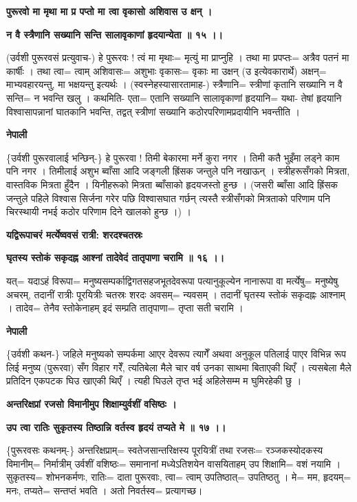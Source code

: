 \documentclass[11pt, a5paper]{article}
\begin{document}
\textbf{पुरूरवो मा मृथा मा प्र पप्तो मा त्वा वृकासो अशिवास उ क्षन् ।}

\textbf{न वै स्त्रैणानि सख्यानि सन्ति सालावृकाणां हृदयान्येता ॥ १५ ।।}

(उर्वशी पुरूरवसं प्रत्युवाच-) हे पुरूरवः ! त्वं मा मृथाः= मृत्युं मा प्राप्नुहि । तथा मा प्रपप्तः= अत्रैव पतनं मा कार्षीः । तथा त्वा= त्वाम् अशिवासः= अशुभाः वृकासः= वृकाः मा उक्षन् (उ इत्येवकारार्थे) अक्षन्= माभ्यवहारयन्तु, मा भक्षयन्तु इत्यर्थः । (स्वस्नेहस्यासारतामाह-) स्त्रैणानि= स्त्रीणां कृतानि सख्यानि न वै सन्ति= न भवन्ति खलु । कथमिति- एता= एतानि सख्यानि सालावृकाणां हृदयानि= यथा- तेषां हृदयानि विश्वासापन्नानां घातकानि भवन्ति, तद्वत् स्त्रीणां सख्यानि कठोरपरिणामप्रदायीनि भवन्तीति ।

\textbf{नेपाली}

\{उर्वशी पुरूरवालाई भन्छिन्-\} हे पुरूरवा ! तिमी बेकारमा मर्ने कुरा नगर । तिमी कतै भुइँमा लड्ने काम पनि नगर । तिमीलाई अशुभ ब्वाँसा आदि जङ्गली ह्रिंसक जन्तुले पनि नखाऊन् । स्त्रीहरूसँगको मित्रता, वास्तविक मित्रता हुँदैन । यिनीहरूको मित्रता ब्बाँसाको हृदयजस्तो हुन्छ । (जसरी ब्बाँसा आदि ह्रिंसक जन्तुले पहिले विश्वास सिर्जना गरेर पछि विश्वासघात गर्छन् त्यस्तै स्त्रीसँगको मित्रताको परिणाम पनि चिरस्थायी नभई कठोर परिणाम दिने खालको हुन्छ ।) ।

\textbf{यद्विरूपाचरं मर्त्येष्ववसं रात्री: शरदश्चतस्रः}

\textbf{घृतस्य स्तोकं सकृदह्न आश्नां तादेवेदं तातृपाणा चरामि ॥ १६ ।।}

यत्= यदाऽहं विरूपा= मनुष्यसम्पर्काद्विगतसहजभूतदेवरूपा पत्यानुकूल्येन नानारूपा वा मर्त्येषु= मनुष्येषु अचरम्,  तदानीं रात्रीः पूरयित्रीः चतस्रः शरदः अवसम्= न्यवसम् । तदानीं घृतस्य स्तोकं सकृदह्नः आश्नाम् । तादेव= तेनैव स्तोकेनाहम् इदं सम्प्रति तातृपाणा= तृप्ता सती चरामि ।

\textbf{नेपाली}

\{उर्वशी कथन-\} जहिले मनुष्यको सम्पर्कमा आएर देवरूप त्यागेँ अथवा अनुकूल पतिलाई पाएर विभिन्न रूप लिई मनुष्य (पुरूरवा) सँग विहार गरेँ, त्यतिबेला मैले चार वर्ष उनका साथमा बिताएकी थिएँ । त्यसबेला मैले प्रतिदिन एकपटक घिउ खाएकी थिएँ । त्यही घिउले तृप्त भई अहिलेसम्म म घुमिरहेकी छु ।

\textbf{अन्तरिक्षप्रां रजसो विमानीमुप शिक्षाम्युर्वशीं वसिष्ठः ।}

\textbf{उप त्वा रातिः सुकृतस्य तिष्ठान्नि वर्तस्व हृदयं तप्यते मे ॥ १७ ।।}

\{पुरूरवसः कथनम्-\} अन्तरिक्षप्राम्= स्वतेजसान्तरिक्षस्य पूरयित्रीं तथा रजसः= रञ्जकस्योदकस्य विमानीम्= निर्मात्रीम् उर्वशीं वशिष्ठः= समानानां मध्येऽतिशयेन वासयिताहम् उप शिक्षामि= वशं नयामि । सुकृतस्य= शोभनकर्मणः, रातिः= दाता पुरूरवाः, त्वा= त्वाम् उपतिष्ठात्= उपतिष्ठतु । मे= मम, हृदयम्= मनः, तप्यते= सन्तप्तं भवति । अतो निवर्तस्व= प्रत्यागच्छ।
\end{document}
